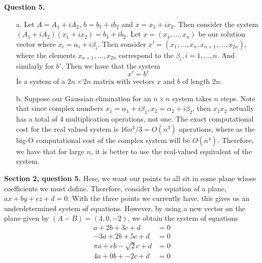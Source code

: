 \documentclass{article}
\begin{document}
\textbf{Question 5.}
\begin{itemize}
    \item[a.] Let $A=A_1+iA_2$, $b=b_1+ib_2$ and $x=x_1+ix_2$. Then consider the system $(A_1+iA_2)(x_1+ix_2)=b_1+ib_2$. Let $x=(x_1,...,x_n)$ be our solution vector where $x_i=\alpha_i + i \beta_i$. Then consider $x'=(x_1,...,x_{n}, x_{n+1},...,x_{2n})$, where the elements $x_{n+1},...,x_{2n}$ correspond to the $\beta_i, i=1,...,n$. And similarly for $b'$. Then we have that the system 
    \begin{equation*}
        [A_1 A_2]x' = b'
    \end{equation*} 
    Is a system of a $2n \times 2n$ matrix with vectors $x$ and $b$ of length $2n$. 
    \item[b.] Suppose our Gaussian elimination for an $n\times n$ system takes $n$ steps. Note that since complex numbers $x_1 = \alpha_1 + i\beta_1, x_2=\alpha_2 + i \beta_2$, then $x_1 x_2$ actually has a total of $4$ multiplication operations, not one. The exact computational cost for the real valued system is $16n^3/3=O(n^3)$ operations, where as the big-O computational cost of the complex system will be $O(n^4)$. Therefore, we have that for large $n$, it is better to use the real-valued equivalent of the system. 
\end{itemize}

\textbf{Section 2, question 5.} Here, we want our points to all sit in some plane whose coefficients we must define. Therefore, consider the equation of a plane, $ax+by+cz+d=0$. With the three points we currently have, this gives us an underdetermined system of equations. However, by using a new vector on the plane given by $(A-B) = (4, 0, -2)$, we obtain the system of equations 
\begin{align*}
    a+2b+3c+d&=0\\
    -3a+2b+5c+d&=0\\
    \pi a+eb-\sqrt{2}c + d&=0\\
    4a + 0b +-2c+d &=0
\end{align*}
\end{document}
